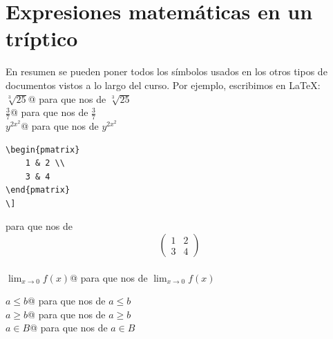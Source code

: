 \documentclass[10pt, notumble, letterpaper]{leaflet}
\begin{document}
\newpage
\section{Expresiones matemáticas en un tríptico}
En resumen se pueden poner todos los símbolos usados en los otros tipos de documentos vistos a lo largo del curso. Por ejemplo, escribimos en \LaTeX{}:\\

\verb@$\sqrt[3]{25}$@ para que nos de $\sqrt[3]{25}$\\

\verb@$\frac{3}{7}$@ para que nos de $\frac{3}{7}$\\

\verb@$y^{2x^2}$@ para que nos de $y^{2x^2}$\\
\begin{verbatim}
\begin{pmatrix}
	1 & 2 \\
	3 & 4
\end{pmatrix}
\] 
\end{verbatim}

para que nos de
\[
\begin{pmatrix}
	1 & 2 \\
	3 & 4
\end{pmatrix}
\]\\

\verb@$\displaystyle \lim_{x\to 0} f(x)$@ para que nos de $\displaystyle \lim_{x\to 0} f(x)$

\verb@$a \leq b$@ para que nos de $a \leq b$\\

\verb@$a \geq b$@ para que nos de $a \geq b$\\

\verb@$a \in B$@ para que nos de $a \in B$\\

\newpage
\end{document}
